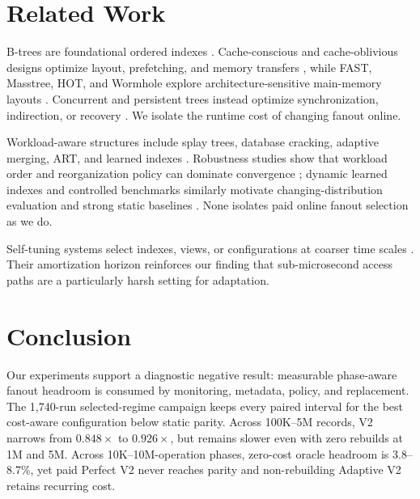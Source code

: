 \documentclass[sigconf,review,anonymous]{acmart}
\begin{document}
\section{Related Work}

B-trees are foundational ordered indexes
\cite{bayer1972organization,comer1979ubiquitous,graefe2011modern}.
Cache-conscious and cache-oblivious designs optimize layout, prefetching, and
memory transfers \cite{rao1999cache,rao2000making,chen2001fractal,bender2000cache},
while FAST, Masstree, HOT, and Wormhole explore architecture-sensitive
main-memory layouts \cite{kim2010fast,mao2012masstree,binna2018hot,wu2019wormhole}.
Concurrent and persistent trees instead optimize synchronization, indirection,
or recovery \cite{lehman1981efficient,graefe2010locking,sewall2011palm,
levandoski2013bw,oukid2016fptree,arulraj2018bztree}.  We isolate the runtime cost
of changing fanout online.

Workload-aware structures include splay trees, database cracking, adaptive
merging, ART, and learned indexes
\cite{sleator1985self,idreos2007database,idreos2011adaptive,leis2013adaptive,
kraska2018case,ding2020alex,galakatos2019fiting}.  Robustness studies show that
workload order and reorganization policy can dominate convergence
\cite{halim2012stochastic,schuhknecht2013uncracked}; dynamic learned indexes and
controlled benchmarks similarly motivate changing-distribution evaluation and
strong static baselines
\cite{ferragina2020pgm,kipf2020radixspline,tang2020xindex,wu2021lipp,
marcus2020benchmark}.  None isolates paid online fanout selection as we do.

Self-tuning systems select indexes, views, or configurations at coarser time
scales \cite{chaudhuri1998autoadmin,weikum2002selftuning,pavlo2017selfdriving,
vanaken2017automatic}.  Their amortization horizon reinforces our finding that
sub-microsecond access paths are a particularly harsh setting for adaptation.

\section{Conclusion}

Our experiments support a diagnostic negative result: measurable phase-aware
fanout headroom is consumed by monitoring, metadata, policy, and replacement.
The 1,740-run selected-regime campaign keeps every paired interval for the best
cost-aware configuration below static parity.  Across 100K--5M records, V2
narrows from \(0.848\times\) to \(0.926\times\), but remains slower even with
zero rebuilds at 1M and 5M.  Across 10K--10M-operation phases, zero-cost oracle
headroom is 3.8--8.7\%, yet paid Perfect V2 never reaches parity and
non-rebuilding Adaptive V2 retains recurring cost.
\end{document}
